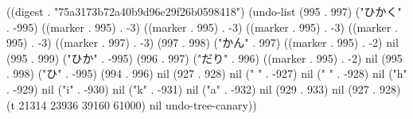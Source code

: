 
((digest . "75a3173b72a40b9d96e29f26b0598418") (undo-list (995 . 997) ("ひかく" . -995) ((marker . 995) . -3) ((marker . 995) . -3) ((marker . 995) . -3) ((marker . 995) . -3) ((marker . 997) . -3) (997 . 998) ("かん" . 997) ((marker . 995) . -2) nil (995 . 999) ("ひか" . -995) (996 . 997) ("だり" . 996) ((marker . 995) . -2) nil (995 . 998) ("ひ" . -995) (994 . 996) nil (927 . 928) nil ("
" . -927) nil (" " . -928) nil ("h" . -929) nil ("i" . -930) nil ("k" . -931) nil ("a" . -932) nil (929 . 933) nil (927 . 928) (t 21314 23936 39160 61000) nil undo-tree-canary))
